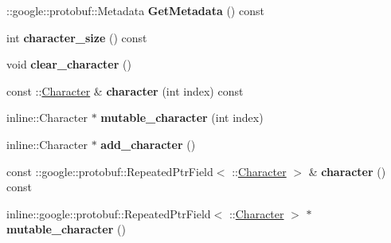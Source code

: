 \begin{DoxyCompactItemize}
\item 
\+::google\+::protobuf\+::\+Metadata {\bfseries Get\+Metadata} () const \hypertarget{classCharacterList_adb5941fe37a628f8add547299178c3b6}{}\label{classCharacterList_adb5941fe37a628f8add547299178c3b6}

\item 
int {\bfseries character\+\_\+size} () const \hypertarget{classCharacterList_ac81e72b6db9cb80d4535f509d7f1f433}{}\label{classCharacterList_ac81e72b6db9cb80d4535f509d7f1f433}

\item 
void {\bfseries clear\+\_\+character} ()\hypertarget{classCharacterList_a174ebd6f142f1291b08f3198c02e2c26}{}\label{classCharacterList_a174ebd6f142f1291b08f3198c02e2c26}

\item 
const \+::\hyperlink{classCharacter}{Character} \& {\bfseries character} (int index) const \hypertarget{classCharacterList_a5594fe03d683c7b1d711c96c6039b9c8}{}\label{classCharacterList_a5594fe03d683c7b1d711c96c6039b9c8}

\item 
inline\+::\+Character $\ast$ {\bfseries mutable\+\_\+character} (int index)\hypertarget{classCharacterList_af4916b9b95cfe6243a465cd4f9a56cdf}{}\label{classCharacterList_af4916b9b95cfe6243a465cd4f9a56cdf}

\item 
inline\+::\+Character $\ast$ {\bfseries add\+\_\+character} ()\hypertarget{classCharacterList_aad299d4b8b21eb2349974bd9cd3187d7}{}\label{classCharacterList_aad299d4b8b21eb2349974bd9cd3187d7}

\item 
const \+::google\+::protobuf\+::\+Repeated\+Ptr\+Field$<$ \+::\hyperlink{classCharacter}{Character} $>$ \& {\bfseries character} () const \hypertarget{classCharacterList_a40c5d419b9d4a7ae03aaf699c3df7feb}{}\label{classCharacterList_a40c5d419b9d4a7ae03aaf699c3df7feb}

\item 
inline\+::google\+::protobuf\+::\+Repeated\+Ptr\+Field$<$ \+::\hyperlink{classCharacter}{Character} $>$ $\ast$ {\bfseries mutable\+\_\+character} ()\hypertarget{classCharacterList_a7a1ab42b9b5441fdeb8d8f3a95c4238c}{}\label{classCharacterList_a7a1ab42b9b5441fdeb8d8f3a95c4238c}

\end{DoxyCompactItemize}
